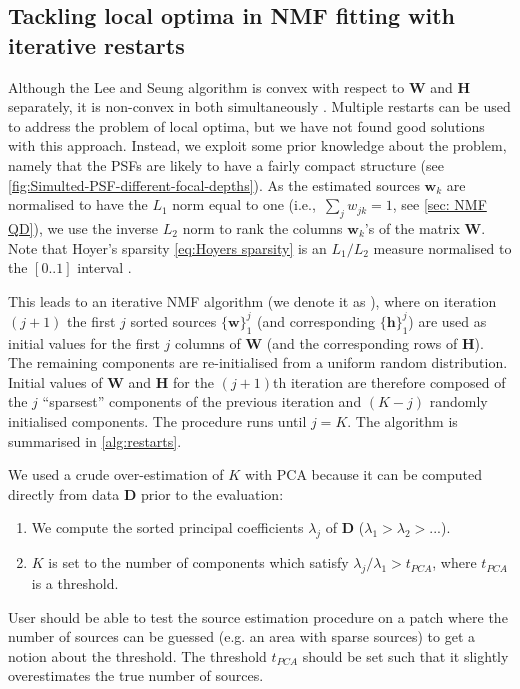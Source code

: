 \clearpage
\subsection{Tackling local optima in NMF fitting with iterative restarts \label{sub: Iterative restarts}}

Although the Lee and Seung algorithm is convex with respect to $\bm{W}$ and $\bm{H}$ separately, it is non-convex in both simultaneously \cite{Lee2001}. Multiple restarts can be used to address the problem of local optima, but we have not found good solutions with this approach. Instead, we exploit some prior knowledge about the problem, namely that the PSFs are likely to have a fairly compact structure (see \autoref{fig:Simulted-PSF-different-focal-depths}). As the estimated sources $\bm{w}_k$ are normalised to have the $L_1$ norm equal to one (i.e.,\ $\sum_j w_{jk}=1$, see \autoref{sec: NMF QD}), we use the inverse $L_2$ norm to rank the columns $\bm{w}_k$'s of the matrix $\bm{W}$. Note that Hoyer's sparsity \autoref{eq:Hoyers sparsity} is an $L_1/L_2$ measure normalised to the $[0..1]$ interval \cite{Kim2008}. 

This leads to an iterative NMF algorithm (we denote it as \inmf{}), where on iteration $(j+1)$ the first $j$ sorted sources $\{ \bm{w} \}_1^j$ (and corresponding $\{ \bm{h} \}_1^j$) are used as initial values for the first $j$ columns of $\bm{W}$ (and the corresponding rows of $\bm{H}$). The remaining components are re-initialised from a uniform random distribution. Initial values of $\bm{W}$ and $\bm{H}$ for the $(j+1)$th iteration are therefore composed of the $j$ ``sparsest'' components of the previous iteration and $(K-j)$ randomly initialised components. The procedure runs until $j=K$. The \inmf{} algorithm is summarised in \autoref{alg:restarts}. 

We used a crude over-estimation of $K$ with PCA because it can be computed directly from data $\bm{D}$ prior to the evaluation: 
%
\begin{enumerate}
	\item
	We compute the sorted principal coefficients $\lambda_j$ of $\bm{D}$ ($\lambda_1>\lambda_2>...$). 
	\item
	$K$ is set to the number of components which satisfy $\lambda_j/\lambda_1>t_{PCA}$, where $t_{PCA}$ is a threshold. 
\end{enumerate}
%
User should be able to test the source estimation procedure on a patch where the number of sources can be guessed (e.g. an area with sparse sources) to get a notion about the threshold. The threshold $t_{PCA}$ should be set such that it slightly overestimates the true number of sources.

